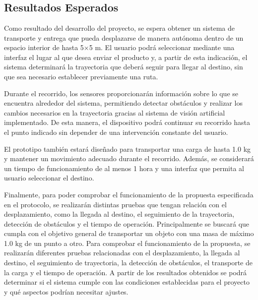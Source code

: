 
\chapter{\tituloValidacion}
\label{cap:validacion}

\section{Resultados Esperados}
\label{sec:Res_esperados}

Como resultado del desarrollo del proyecto, se espera obtener un sistema de transporte y entrega que pueda desplazarse de manera autónoma dentro de un espacio interior de hasta 5×5 m. El usuario podrá seleccionar mediante una interfaz el lugar al que desea enviar el producto y, a partir de esta indicación, el sistema determinará la trayectoria que deberá seguir para llegar al destino, sin que sea necesario establecer previamente una ruta.

Durante el recorrido, los sensores proporcionarán información sobre lo que se encuentra alrededor del sistema, permitiendo detectar obstáculos y realizar los cambios necesarios en la trayectoria gracias al sistema de visión artificial implementado. De esta manera, el dispositivo podrá continuar su recorrido hasta el punto indicado sin depender de una intervención constante del usuario.

El prototipo también estará diseñado para transportar una carga de hasta 1.0 kg y mantener un movimiento adecuado durante el recorrido. Además, se considerará un tiempo de funcionamiento de al menos 1 hora y una interfaz que permita al usuario seleccionar el destino.

Finalmente, para poder comprobar el funcionamiento de la propuesta especificada en el protocolo, se realizarán distintas pruebas que tengan relación con el desplazamiento, como la llegada al destino, el seguimiento de la trayectoria, detección de obstáculos y el tiempo de operación. Principalmente se buscará que cumpla con el objetivo general de transportar un objeto con una masa de máximo 1.0 kg de un punto a otro. 
Para comprobar el funcionamiento de la propuesta, se realizarán diferentes pruebas relacionadas con el desplazamiento, la llegada al destino, el seguimiento de trayectoria, la detección de obstáculos, el transporte de la carga y el tiempo de operación. A partir de los resultados obtenidos se podrá determinar si el sistema cumple con las condiciones establecidas para el proyecto y qué aspectos podrían necesitar ajustes.
